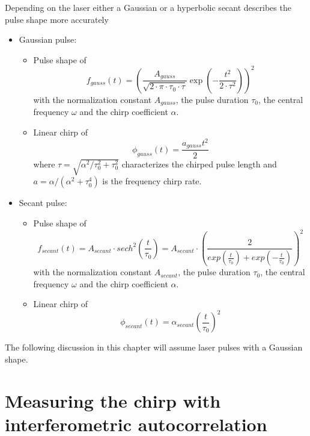 Depending on the laser either a Gaussian or a hyperbolic secant describes the pulse shape more accurately~\cite{glassl_biexciton_2013, hirayama_real-time_2002}

\begin{itemize}
	\item Gaussian pulse:
	\begin{itemize}
		\item Pulse shape of
		$$f_{gauss}(t) = \left(\frac{A_{gauss}}{\sqrt{2 \cdot \pi \cdot \tau_0 \cdot \tau}} \exp\left(-\frac{t^2}{2 \cdot \tau^2}\right)\right)^2$$
		with the normalization constant $A_{gauss}$, the pulse duration $\tau_0$, the central frequency $\omega$ and the chirp coefficient $\alpha$.
		\item Linear chirp of
		$$\phi_{gauss}(t) = \frac{a_{gauss} t^2}{2}$$
		where $\tau = \sqrt{\alpha^2 / \tau_0^2 + \tau_0^2}$ characterizes the chirped pulse length and $a = \alpha / (\alpha ^ 2 + \tau _0 ^ 4)$ is the frequency chirp rate.
	\end{itemize}
	\item Secant pulse:
	\begin{itemize}
		\item Pulse shape of
		$$f_{secant}(t) = A_{secant} \cdot sech^2\left(\frac{t}{\tau_0}\right) = A_{secant} \cdot \left(\frac{2}{exp(\frac{t}{\tau_0}) + exp(-\frac{t}{\tau_0})}\right)^2$$
		with the normalization constant $A_{secant}$, the pulse duration $\tau_0$, the central frequency $\omega$ and the chirp coefficient $\alpha$.
		\item Linear chirp of
		$$\phi_{secant}(t) = \alpha_{secant}\left(\frac{t}{\tau_0}\right)^2$$
	\end{itemize}
\end{itemize}
	
The following discussion in this chapter will assume laser pulses with a Gaussian shape. 


\section{Measuring the chirp with interferometric autocorrelation}

